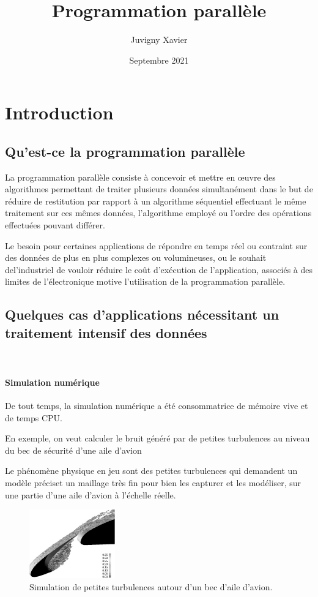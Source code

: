 \documentclass[fleqn,11pt]{article}
\title{Programmation parallèle}
\author{Juvigny Xavier}
\date{Septembre 2021}
\begin{document}
\maketitle
\tableofcontents

\section{Introduction}

\subsection{Qu'est-ce la programmation parallèle}

La programmation parallèle consiste à concevoir et mettre en œuvre des algorithmes permettant de traiter plusieurs données simultanément dans le but de réduire de restitution par rapport à un algorithme séquentiel effectuant le même traitement sur ces mêmes données, l'algorithme employé ou l'ordre des opérations effectuées pouvant différer. 

Le besoin pour certaines applications de répondre en temps réel ou contraint sur des données de plus en plus complexes ou volumineuses, ou le souhait del'industriel de vouloir réduire le coût d'exécution de l'application, associés à des limites de l'électronique motive l'utilisation de la programmation parallèle. 

\subsection{Quelques cas d'applications nécessitant un traitement intensif des données}
\
\paragraph{Simulation numérique }

De tout temps, la simulation numérique a été consommatrice de mémoire vive et de temps CPU. 

En exemple, on veut calculer le bruit généré par de petites turbulences au niveau du bec de sécurité d'une aile d'avion

Le phénomène physique en jeu sont des petites turbulences qui demandent un modèle préciset un maillage très fin pour bien les capturer
et les modéliser, sur une partie d'une aile d'avion à l'échelle réelle.

\begin{figure}[h]
\begin{center}
\includegraphics[width=0.33\textwidth]{SlatWingTurb1}
\caption{Simulation de petites turbulences autour d'un bec d'aile d'avion.}
\end{center}
\end{figure}
\end{document}
